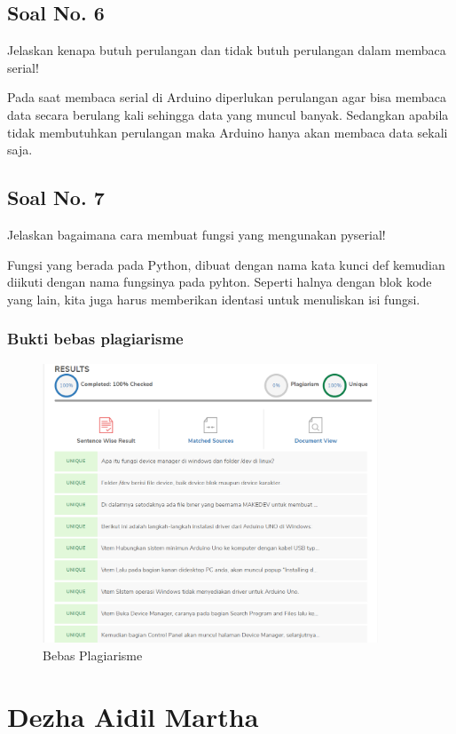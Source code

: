 \subsection{Soal No. 6}
Jelaskan kenapa butuh perulangan dan tidak butuh perulangan dalam membaca serial!

\hfill \break
Pada saat membaca serial di Arduino diperlukan perulangan agar bisa membaca data secara berulang kali sehingga data yang muncul banyak. Sedangkan apabila tidak membutuhkan perulangan maka Arduino hanya akan membaca data sekali saja.

\subsection{Soal No. 7}
Jelaskan bagaimana cara membuat fungsi yang mengunakan pyserial!

\hfill \break
Fungsi yang berada pada Python, dibuat dengan nama kata kunci def kemudian diikuti dengan nama fungsinya pada pyhton.
Seperti halnya dengan blok kode yang lain, kita juga harus memberikan identasi untuk menuliskan isi fungsi.

\subsubsection{Bukti bebas plagiarisme}
\begin{figure}[h]
\centering
\includegraphics[width=10cm]{figures/5/Teori/1174051/Plagiat.png}
\caption{Bebas Plagiarisme}
\label{Evietania}
\end{figure}


\section{Dezha Aidil Martha}
